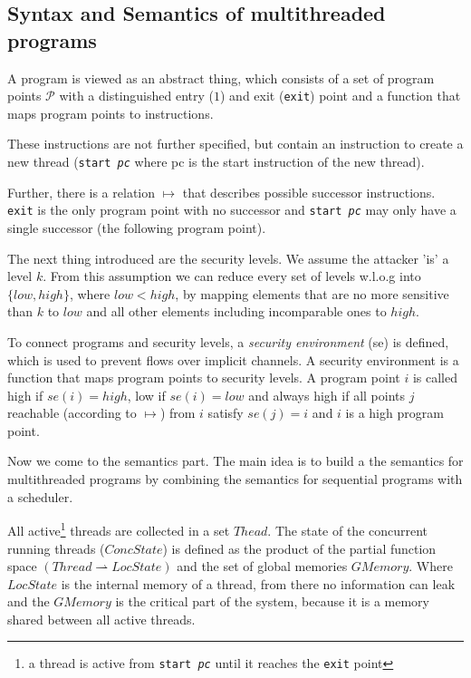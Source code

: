 \documentclass[a4paper,10pt]{llncs}
\begin{document}
\subsection{Syntax and Semantics of multithreaded programs}
\label{sec:syntaxsemantics}
A program is viewed as an abstract thing, which consists of a set of
program points $\mathcal{P}$ with a distinguished entry ($1$) and exit
(\texttt{exit}) point and a function that maps program points to
instructions.

These instructions are not further specified, but contain an instruction
to create a new thread (\texttt{start \textit{pc}} where pc is the start
instruction of the new thread).

Further, there is a relation $\mapsto$ that describes possible successor
instructions. \texttt{exit} is the only program point with no successor
and \texttt{start \textit{pc}} may only have a single successor (the
following program point).

The next thing introduced are the security levels. We assume the attacker
'is' a level $k$. From this assumption we can reduce every set of levels
w.l.o.g into $\{low, high\}$, where $low < high$, by mapping elements
that are no more sensitive than $k$ to $low$ and all other elements
including incomparable ones to $high$.

To connect programs and security levels, a \textit{security environment}
(se) is defined, which is used to prevent flows over implicit channels.
A security environment is a function that maps program points to security
levels. A program point $i$ is called high if $se(i) = high$, low if $se(i)
= low$ and always high if all points $j$ reachable (according to $\mapsto$)
from $i$ satisfy $se(j) = i$ and $i$ is a high program point.

Now we come to the semantics part. The main idea is to build a the semantics
for multithreaded programs by combining the semantics for sequential programs
with a scheduler.

All active\footnote{a thread is active from \texttt{start \textit{pc}} until
it reaches the \texttt{exit} point} threads are collected in a set $Thead$.
The state of the concurrent running threads ($ConcState$) is defined as the
product of the partial function space $(Thread \rightharpoonup LocState)$
and the set of global memories $GMemory$. Where $LocState$ is the internal
memory of a thread, from there no information can leak and the $GMemory$ is
the critical part of the system, because it is a memory shared between all
active threads.
\end{document}
